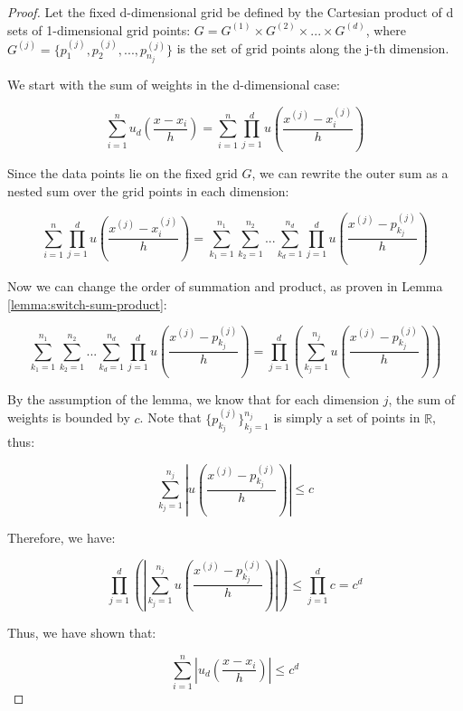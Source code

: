 \begin{proof}
Let the fixed d-dimensional grid be defined by the Cartesian product of d sets of 1-dimensional grid points: $G = G^{(1)} \times G^{(2)} \times ... \times G^{(d)}$, where $G^{(j)} = \{p_1^{(j)}, p_2^{(j)}, ..., p_{n_j}^{(j)}\}$ is the set of grid points along the j-th dimension.

We start with the sum of weights in the d-dimensional case:

$$
\sum_{i=1}^n u_d\left(\frac{x - x_i}{h}\right) = \sum_{i=1}^n \prod_{j=1}^d u\left(\frac{x^{(j)} - x_i^{(j)}}{h}\right)
$$

Since the data points lie on the fixed grid $G$, we can rewrite the outer sum as a nested sum over the grid points in each dimension:

$$
\sum_{i=1}^n \prod_{j=1}^d u\left(\frac{x^{(j)} - x_i^{(j)}}{h}\right) = \sum_{k_1=1}^{n_1} \sum_{k_2=1}^{n_2} ... \sum_{k_d=1}^{n_d} \prod_{j=1}^d u\left(\frac{x^{(j)} - p_{k_j}^{(j)}}{h}\right)
$$

Now we can change the order of summation and product, as proven in Lemma \ref{lemma:switch-sum-product}:

$$
\sum_{k_1=1}^{n_1} \sum_{k_2=1}^{n_2} ... \sum_{k_d=1}^{n_d} \prod_{j=1}^d u\left(\frac{x^{(j)} - p_{k_j}^{(j)}}{h}\right) = \prod_{j=1}^d \left( \sum_{k_j=1}^{n_j} u\left(\frac{x^{(j)} - p_{k_j}^{(j)}}{h}\right) \right)
$$

By the assumption of the lemma, we know that for each dimension $j$, the sum of weights is bounded by $c$. Note that $\{p_{k_j}^{(j)}\}_{k_j=1}^{n_j}$ is simply a set of points in $\mathbb{R}$, thus:

$$
\sum_{k_j=1}^{n_j} \left|u\left(\frac{x^{(j)} - p_{k_j}^{(j)}}{h}\right)\right| \leq c
$$

Therefore, we have:

$$
\prod_{j=1}^d \left(\left| \sum_{k_j=1}^{n_j} u\left(\frac{x^{(j)} - p_{k_j}^{(j)}}{h}\right)\right| \right) \leq \prod_{j=1}^d c = c^d
$$

Thus, we have shown that:

$$
\sum_{i=1}^n \left|u_d\left(\frac{x - x_i}{h}\right) \right|\leq c^d
$$

\end{proof}

